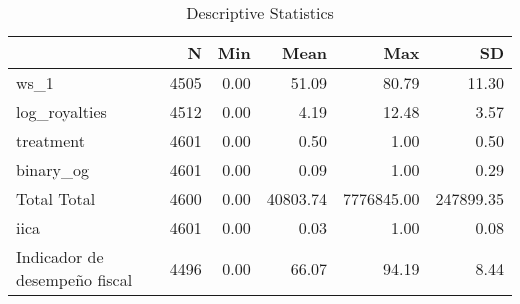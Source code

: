 \begin{table}[t]
\caption*{
{\large Descriptive Statistics}
} 
\fontsize{12.0pt}{14.4pt}\selectfont
\begin{tabular*}{\linewidth}{@{\extracolsep{\fill}}lrrrrr}
\toprule
  & N & Min & Mean & Max & SD \\ 
\midrule\addlinespace[2.5pt]
ws\_1 & 4505 & 0.00 & 51.09 & 80.79 & 11.30 \\ 
log\_royalties & 4512 & 0.00 & 4.19 & 12.48 & 3.57 \\ 
treatment & 4601 & 0.00 & 0.50 & 1.00 & 0.50 \\ 
binary\_og & 4601 & 0.00 & 0.09 & 1.00 & 0.29 \\ 
Total Total & 4600 & 0.00 & 40803.74 & 7776845.00 & 247899.35 \\ 
iica & 4601 & 0.00 & 0.03 & 1.00 & 0.08 \\ 
       Indicador de desempeño fiscal & 4496 & 0.00 & 66.07 & 94.19 & 8.44 \\ 
\bottomrule
\end{tabular*}
\end{table}
